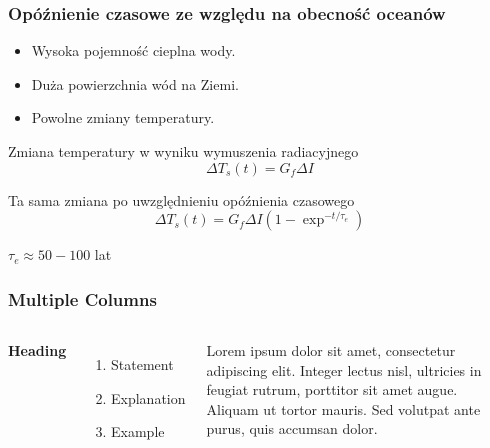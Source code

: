 \documentclass{beamer}
\begin{document}
\begin{frame}
	\frametitle{Opóźnienie czasowe ze względu na obecność oceanów}
	
	\begin{itemize}
		\item Wysoka pojemność cieplna wody.
		
		\item Duża powierzchnia wód na Ziemi.
		
		\item Powolne zmiany temperatury.
	
	\end{itemize}
	
	\begin{block}{Zmiana temperatury w wyniku wymuszenia radiacyjnego}
		\[\Delta T_s(t) = G_f\Delta I
		\]
	\end{block}
	
	\begin{block}{Ta sama zmiana po uwzględnieniu opóźnienia czasowego}
		\[\Delta T_s(t) = G_f\Delta I(1-\exp^{-t/\tau _e})
		\]
	\end{block}
	
	$\tau _e \approx 50-100$ lat
	
\end{frame}




















\begin{frame}
\frametitle{Multiple Columns}
\begin{columns}[c] %

\textbf{Heading}
\begin{enumerate}
\item Statement
\item Explanation
\item Example
\end{enumerate}

Lorem ipsum dolor sit amet, consectetur adipiscing elit. Integer lectus nisl, ultricies in feugiat rutrum, porttitor sit amet augue. Aliquam ut tortor mauris. Sed volutpat ante purus, quis accumsan dolor.

\end{columns}
\end{frame}
\end{document}
